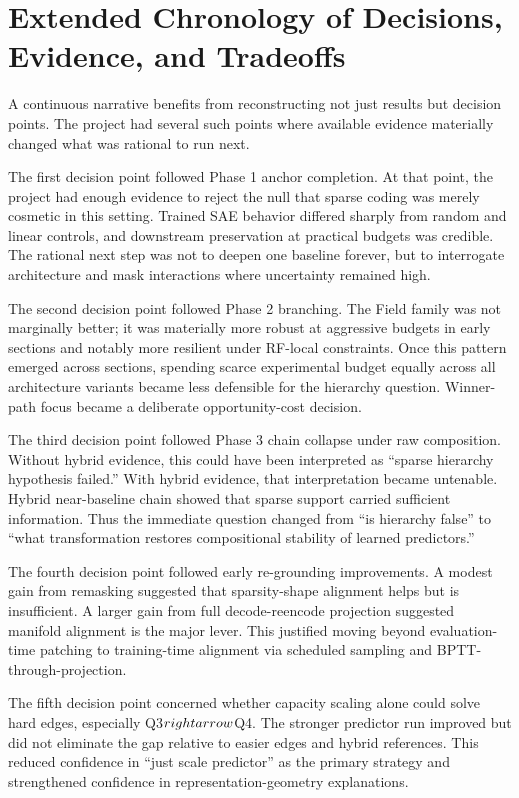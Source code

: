 \documentclass[11pt]{article}
\begin{document}
\section{Extended Chronology of Decisions, Evidence, and Tradeoffs}
A continuous narrative benefits from reconstructing not just results but decision points. The project had several such points where available evidence materially changed what was rational to run next.

The first decision point followed Phase 1 anchor completion. At that point, the project had enough evidence to reject the null that sparse coding was merely cosmetic in this setting. Trained SAE behavior differed sharply from random and linear controls, and downstream preservation at practical budgets was credible. The rational next step was not to deepen one baseline forever, but to interrogate architecture and mask interactions where uncertainty remained high.

The second decision point followed Phase 2 branching. The Field family was not marginally better; it was materially more robust at aggressive budgets in early sections and notably more resilient under RF-local constraints. Once this pattern emerged across sections, spending scarce experimental budget equally across all architecture variants became less defensible for the hierarchy question. Winner-path focus became a deliberate opportunity-cost decision.

The third decision point followed Phase 3 chain collapse under raw composition. Without hybrid evidence, this could have been interpreted as ``sparse hierarchy hypothesis failed.'' With hybrid evidence, that interpretation became untenable. Hybrid near-baseline chain showed that sparse support carried sufficient information. Thus the immediate question changed from ``is hierarchy false'' to ``what transformation restores compositional stability of learned predictors.''

The fourth decision point followed early re-grounding improvements. A modest gain from remasking suggested that sparsity-shape alignment helps but is insufficient. A larger gain from full decode-reencode projection suggested manifold alignment is the major lever. This justified moving beyond evaluation-time patching to training-time alignment via scheduled sampling and BPTT-through-projection.

The fifth decision point concerned whether capacity scaling alone could solve hard edges, especially Q3$\\rightarrow$Q4. The stronger predictor run improved but did not eliminate the gap relative to easier edges and hybrid references. This reduced confidence in ``just scale predictor'' as the primary strategy and strengthened confidence in representation-geometry explanations.
\end{document}
